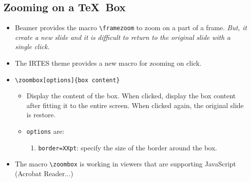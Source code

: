 \documentclass[english,circlenumberstyle]{irtesbeamer}
\begin{document}
\subsection{Zooming on a \TeX\ Box}
\begin{frame}{\subsecname}
	\begin{itemize}
	\item Beamer provides the macro \texttt{{\textbackslash}framezoom} to zoom on a part of a frame. \emph{But, it create a new slide and it is difficult to return to the original slide with a single click}.	
	\item The IRTES theme provides a new macro for zooming on click.
	\item \texttt{{\textbackslash}zoombox[options]\{box content\}}
		\begin{itemize}
		\item Display the content of the box. When clicked, display the box content after fitting it to the entire screen. When clicked again, the original slide is restore.
		\item \texttt{options} are:
			\begin{enumerate}
			\item \texttt{border=XXpt}: specify the size of the border around the box.
			\end{enumerate}
		\end{itemize}
	\item \alert{The macro \texttt{{\textbackslash}zoombox} is working in viewers that are supporting JavaScript (Acrobat Reader...)}
	\end{itemize}
	\begin{center}
	\end{center}
\end{frame}
\end{document}
